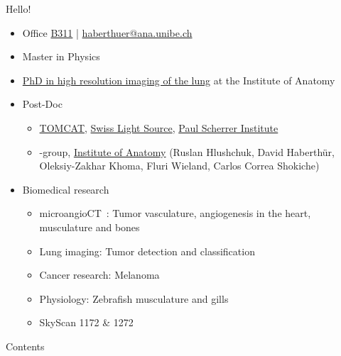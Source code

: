 \begin{frame}{Hello!}
	\begin{itemize}
		\item Office \href{http://osm.org/go/0CZwlGp3A?m}{B311} | \href{mailto:haberthuer@ana.unibe.ch?subject=Feedback\%20from\%20the\%20(micro)-tomography\%20lecture}{haberthuer@ana.unibe.ch}
		\item Master in Physics
		\item \href{https://boris.unibe.ch/2619/}{PhD in high resolution imaging of the lung} at the Institute of Anatomy
		\item Post-Doc
		\begin{itemize}
			\item \href{https://www.psi.ch/sls/tomcat/}{TOMCAT}, \href{https://www.psi.ch/sls/}{Swiss Light Source}, \href{https://www.psi.ch/}{Paul Scherrer Institute}
			\item \uct-group, \href{https://ana.unibe.ch}{Institute of Anatomy} (Ruslan Hlushchuk, David Haberthür, Oleksiy-Zakhar Khoma, Fluri Wieland, Carlos Correa Shokiche)
		\end{itemize}
		\item Biomedical research
		\begin{itemize}
			\item microangioCT~\cite{Hlushchuk2018}: Tumor vasculature, angiogenesis in the heart, musculature and bones
			\item Lung imaging: Tumor detection and classification
			\item Cancer research: Melanoma
			\item Physiology: Zebrafish musculature and gills~\cite{Messerli2019}
			\item SkyScan 1172 \& 1272
		\end{itemize}
	\end{itemize}
\end{frame}

\begin{frame}{Contents}
	\tableofcontents
\end{frame}

